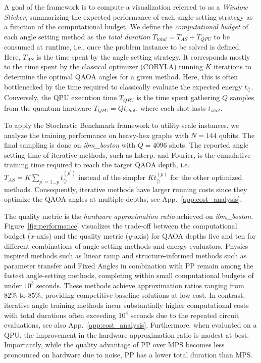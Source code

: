 \documentclass[twocolumn,
english,
aps,
pra,
10pt,
longbibliography,
superscriptaddress,
amsmath,
amssymb,
floatfix
]{revtex4-2}
\begin{document}
{A goal of the framework is to compute a visualization referred to as a \emph{Window Sticker}, summarizing the expected performance of each angle-setting strategy as a function of the computational budget. 
We define the \textit{computational budget} of each angle setting method as the \textit{total duration} $T_{total} = T_{AS}+T_{QPU}$ to be consumed at runtime, i.e., once the problem instance to be solved is defined.
Here, $T_{AS}$ is the time spent by the angle setting strategy. 
It corresponds mostly to the time spent by the classical optimizer (COBYLA) running $K$ iterations to determine the optimal QAOA angles for a given method.
Here, this is often bottlenecked by the time required to classically evaluate the expected energy $t_{\langle \rangle}$.
Conversely, the QPU execution time $T_{QPU}$ is the time spent gathering $Q$ samples from the quantum hardware $T_{QPU} = Q t_{shot}$, where each shot lasts $t_{shot}$. 

To apply the Stochastic Benchmark framework to utility-scale instances, we analyze the training performance on heavy-hex graphs with $N=144$ qubits.
The final sampling is done on \emph{ibm\_boston} with $Q=4096$ shots.
The reported angle setting time of iterative methods, such as Interp. and Fourier, is the cumulative training time required to reach the target QAOA depth, i.e. $T_{AS}=K\sum_{p^\prime=1\dots p} t_{\langle \rangle}^{(p^\prime)}$ instead of the simpler $K t_{\langle \rangle}^{(p)}$ for the other optimized methods.
Consequently, iterative methods have larger running costs since they optimize the QAOA angles at multiple depths, see App.~\ref{app:cost_analysis}. 

The quality metric is the \emph{hardware approximation ratio} achieved on \emph{ibm\_boston}.
Figure~\ref{fig:performance} visualizes the trade-off between the computational budget ($x$-axis) and the quality metric ($y$-axis) for QAOA depths five and ten for different combinations of angle setting methods and energy evaluators.
Physics-inspired methods such as linear ramp and structure-informed methods such as parameter transfer and Fixed Angles in combination with PP remain among the fastest angle-setting methods, completing within small computational budgets of under $10^3$ seconds. 
These methods achieve approximation ratios ranging from $82\%$ to $85\%$, providing competitive baseline solutions at low cost.
In contrast, iterative angle training methods incur substantially higher computational costs with total durations often exceeding $10^4$ seconds due to the repeated circuit evaluations, see also App.~\ref{app:cost_analysis}. 
Furthermore, when evaluated on a QPU, the improvement in the hardware approximation ratio is modest at best.
Importantly, while the quality advantage of PP over MPS becomes less pronounced on hardware due to noise, PP has a lower total duration than MPS.

}
\end{document}
